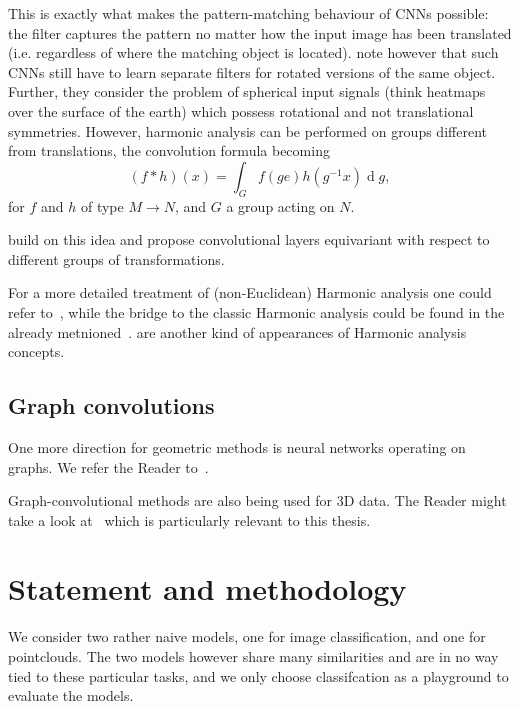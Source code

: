 This is exactly what makes the pattern-matching behaviour of CNNs possible: the
filter captures the pattern no matter how the input image has been translated
(i.e. regardless of where the matching object is located). \citet{s2cnn} note
however that such CNNs still have to learn separate filters for rotated
versions of the same object. Further, they consider the problem of spherical
input signals (think heatmaps over the surface of the earth) which possess
rotational and not translational symmetries. However, harmonic analysis can be
performed on groups different from translations, the convolution
formula becoming
\[
(f * h)(x) = \int_G f(g e) h(g^{-1}x) \operatorname{d}g,
\]
for \( f \) and \( h \) of type \( M\to N \), and \( G \) a group acting on
\( N \).

\citet{s2cnn,cohen2018general,e2cnn} build on this idea and propose
convolutional layers equivariant with respect to different groups of
transformations.

For a more detailed treatment of (non-Euclidean) Harmonic analysis one could
refer
to~\citet{axlerHarmonic,
explorationsHarmonic,
benedettoHarmonic,
stollharmonic,
terrasHarmonicSymmetric,
terrasHarmonicSymmetric2,
fourierS2},
while the bridge to the classic Harmonic analysis could be found in the already
metnioned~\cite{feichtingerFAHA}.
\citet{eyeRotations,zhou2019glosh,scnnNiessner} are another kind of appearances
of Harmonic analysis concepts.

\subsection*{Graph convolutions}

One more direction for geometric methods is neural networks operating on graphs.
We refer the Reader to~\citet{kipf}.

Graph-convolutional methods are also being used for 3D data. The Reader might
take a look at~\citet{edgeconv} which is particularly relevant to this thesis.

\section{Statement and methodology} \label{sec:statement}

We consider two rather naive models, one for image classification, and one for
pointclouds. The two models however share many similarities and are in no way
tied to these particular tasks, and we only choose classifcation as a
playground to evaluate the models.

